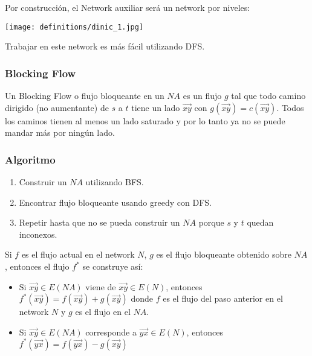 \documentclass[10pt,a4paper]{article}
\begin{document}
Por construcción, el Network auxiliar será un network por niveles:

\begin{center}

    \begin{adjustbox}{max size={\textwidth}{\textheight}}
        \texttt{[image: definitions/dinic\_1.jpg]}
        \end{adjustbox}
    
\end{center}

Trabajar en este network es más fácil utilizando DFS.

\subsubsection*{Blocking Flow}

Un Blocking Flow o flujo bloqueante en un $NA$ es un flujo $g$ tal que todo camino dirigido (no aumentante) de $s$ a $t$ tiene un lado $\overrightarrow{xy}$ con $g(\overrightarrow{xy}) = c(\overrightarrow{xy})$. Todos los caminos tienen al menos un lado saturado y por lo tanto ya no se puede mandar más por ningún lado.

\subsubsection*{Algoritmo}

\begin{enumerate}

	\item Construir un $NA$ utilizando BFS.
	\item Encontrar flujo bloqueante usando greedy con DFS.
	\item Repetir hasta que no se pueda construir un $NA$ porque $s$ y $t$ quedan inconexos.
\end{enumerate}

Si $f$ es el flujo actual en el network $N$, $g$ es el flujo bloqueante obtenido sobre $NA$, entonces el flujo $f^*$ se construye así:

\begin{itemize}

	\item Si $\overrightarrow{xy}\in E(NA)$ viene de $\overrightarrow{xy} \in E(N)$, entonces $f^*(\overrightarrow{xy}) = f(\overrightarrow{xy}) + g(\overrightarrow{xy})$ donde $f$ es el flujo del paso anterior en el network $N$ y $g$ es el flujo en el $NA$.
	\item Si $\overrightarrow{xy} \in E(NA)$ corresponde a $\overrightarrow{yx} \in E(N)$, entonces $f^*(\overrightarrow{yx}) = f(\overrightarrow{yx}) - g(\overrightarrow{xy})$
\end{itemize}
\end{document}
